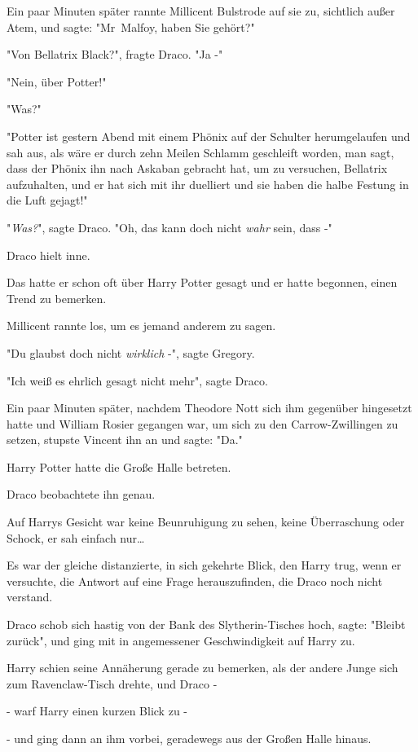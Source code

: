 {Ein paar Minuten später rannte Millicent Bulstrode auf sie zu, sichtlich außer Atem, und sagte: "Mr~Malfoy, haben Sie gehört?"

"Von Bellatrix Black?", fragte Draco. "Ja -"

"Nein, über Potter!"

"Was?"

"Potter ist gestern Abend mit einem Phönix auf der Schulter herumgelaufen und sah aus, als wäre er durch zehn Meilen Schlamm geschleift worden, man sagt, dass der Phönix ihn nach Askaban gebracht hat, um zu versuchen, Bellatrix aufzuhalten, und er hat sich mit ihr duelliert und sie haben die halbe Festung in die Luft gejagt!"

"\emph{Was?}", sagte Draco. "Oh, das kann doch nicht \emph{wahr} sein, dass -"

Draco hielt inne.

Das hatte er schon oft über Harry Potter gesagt und er hatte begonnen, einen Trend zu bemerken.

Millicent rannte los, um es jemand anderem zu sagen.

"Du glaubst doch nicht \emph{wirklich} -", sagte Gregory.

"Ich weiß es ehrlich gesagt nicht mehr", sagte Draco.

Ein paar Minuten später, nachdem Theodore Nott sich ihm gegenüber hingesetzt hatte und William Rosier gegangen war, um sich zu den Carrow-Zwillingen zu setzen, stupste Vincent ihn an und sagte: "Da."

Harry Potter hatte die Große Halle betreten.

Draco beobachtete ihn genau.

Auf Harrys Gesicht war keine Beunruhigung zu sehen, keine Überraschung oder Schock, er sah einfach nur…

Es war der gleiche distanzierte, in sich gekehrte Blick, den Harry trug, wenn er versuchte, die Antwort auf eine Frage herauszufinden, die Draco noch nicht verstand.

Draco schob sich hastig von der Bank des Slytherin-Tisches hoch, sagte: "Bleibt zurück", und ging mit in angemessener Geschwindigkeit auf Harry zu.

Harry schien seine Annäherung gerade zu bemerken, als der andere Junge sich zum Ravenclaw-Tisch drehte, und Draco -

- warf Harry einen kurzen Blick zu -

- und ging dann an ihm vorbei, geradewegs aus der Großen Halle hinaus.

}
